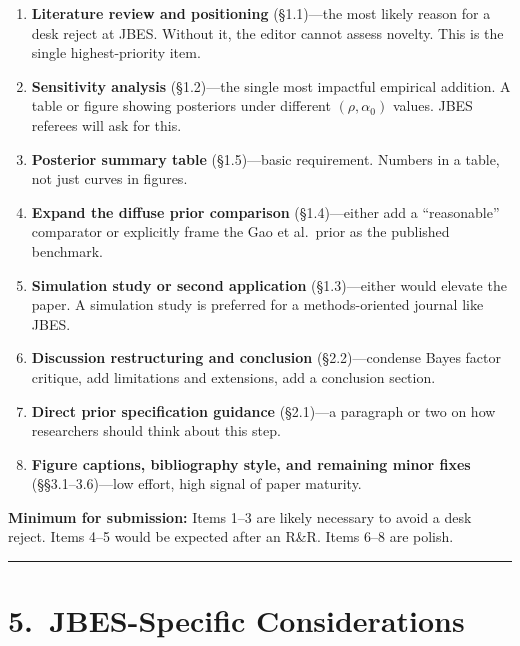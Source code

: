 \documentclass[12pt,a4paper]{article}
\begin{document}
\begin{enumerate}[leftmargin=1.5em]
\item \textbf{Literature review and positioning} (\S1.1)---the most likely
reason for a desk reject at JBES.  Without it, the editor cannot assess
novelty.  This is the single highest-priority item.

\item \textbf{Sensitivity analysis} (\S1.2)---the single most impactful
empirical addition.  A table or figure showing posteriors under different
$(\rho, \alpha_0)$ values.  JBES referees will ask for this.

\item \textbf{Posterior summary table} (\S1.5)---basic requirement.  Numbers in
a table, not just curves in figures.

\item \textbf{Expand the diffuse prior comparison} (\S1.4)---either add a
``reasonable'' comparator or explicitly frame the Gao et al.\ prior as the
published benchmark.

\item \textbf{Simulation study or second application} (\S1.3)---either would
elevate the paper.  A simulation study is preferred for a methods-oriented
journal like JBES.

\item \textbf{Discussion restructuring and conclusion} (\S2.2)---condense Bayes
factor critique, add limitations and extensions, add a conclusion section.

\item \textbf{Direct prior specification guidance} (\S2.1)---a paragraph or two
on how researchers should think about this step.

\item \textbf{Figure captions, bibliography style, and remaining minor fixes}
(\S\S3.1--3.6)---low effort, high signal of paper maturity.
\end{enumerate}

\textbf{Minimum for submission:} Items 1--3 are likely necessary to avoid a desk
reject.  Items 4--5 would be expected after an R\&R.  Items 6--8 are polish.

\vspace{0.5em}
\hrule
\vspace{0.5em}

\section{5.\ JBES-Specific Considerations}
\end{document}

